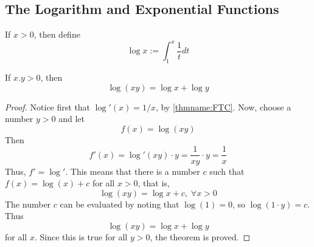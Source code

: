 \documentclass[12pt, a4paper, oneside, openright, titlepage]{book}
\begin{document}
\begin{subappendices}
    \section{The Logarithm and Exponential Functions}
    
    \begin{defn}
        If $x > 0$, then define \begin{equation}
            \log x := \int_1^x\frac{1}{t}dt
        \end{equation}
    \end{defn}

    \begin{thm}
        If $x.y > 0$, then \begin{equation}
            \log(xy) = \log x+ \log y
        \end{equation}
    \end{thm}
    \begin{proof}
        Notice first that $\log'(x) = 1/x$, by \ref{thmname:FTC}. Now, choose a number $y > 0$ and let \begin{equation*}
            f(x) = \log(xy)
        \end{equation*}
        Then\begin{equation*}
            f'(x) = \log'(xy)\cdot y = \frac{1}{xy}\cdot y = \frac{1}{x}
        \end{equation*}
        Thus, $f' = \log'$. This means that there is a number $c$ such that $f(x) = \log(x) + c$ for all $x > 0$, that is, \begin{equation*}
            \log(xy) = \log x+c,\;\forall x > 0
        \end{equation*}
        The number $c$ can be evaluated by noting that $\log(1) = 0$, so $\log(1\cdot y) = c$. Thus \begin{equation*}
            \log(xy) = \log x + \log y
        \end{equation*}
        for all $x$. Since this is true for all $y > 0$, the theorem is proved.
    \end{proof}


\end{subappendices}
\end{document}
